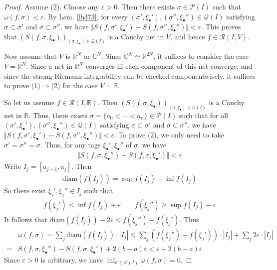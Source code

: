 \documentclass[12pt,b5paper,notitlepage]{article}
\theoremstyle{definition}
\theoremstyle{plain}
\newcommand{\mc}{\mathcal}
\newcommand{\scr}{\mathscr}
\newcommand{\blt}{\bullet}
\newcommand{\Cbb}{\mathbb C}
\newcommand{\Rbb}{\mathbb R}
\newcommand{\dps}{\displaystyle}
\newcommand{\diam}{\mathrm{diam}}
\newcommand{\eps}{\varepsilon}
\numberwithin{equation}{section}
\begin{document}
\begin{proof}
Assume (2). Choose any $\eps>0$. Then there exists $\sigma\in\mc P(I)$ such that $\omega(f,\sigma)<\eps$. By Lem. \ref{lb373}, for every $(\sigma',\xi_\blt'),(\sigma'',\xi_\blt'')\in\mc Q(I)$ satisfying $\sigma\subset\sigma'$ and $\sigma\subset\sigma''$, we have $\Vert S(f,\sigma',\xi_\blt')-S(f,\sigma'',\xi_\blt'')\Vert<\eps$. This proves that $(S(f,\sigma,\xi_\blt))_{(\sigma,\xi_\blt)\in\mc Q(I)}$ is a Cauchy net in $V$, and hence $f\in\scr R(I,V)$.

Now assume that $V$ is $\Rbb^N$ or $\Cbb^N$. Since $\Cbb^N\simeq\Rbb^{2N}$, it suffices to consider the case $V=\Rbb^N$. Since a net in $\Rbb^N$ converges iff each component of this net converge, and since the strong Riemann integrability can be checked componentwisely, it suffices to prove (1)$\Rightarrow$(2) for the case $V=\Rbb$.

So let us assume $f\in\scr R(I,\Rbb)$. Then $(S(f,\sigma,\xi_\blt))_{(\sigma,\xi_\blt)\in\mc Q(I)}$ is a Cauchy net in $\Rbb$. Thus, there exists $\sigma=\{a_0<\cdots<a_n\}\in\mc P(I)$ such that for all $(\sigma',\xi_\blt'),(\sigma'',\xi_\blt'')\in\mc Q(I)$ satisfying $\sigma\subset\sigma'$ and $\sigma\subset\sigma''$, we have $\Vert S(f,\sigma',\xi_\blt')-S(f,\sigma'',\xi_\blt'')\Vert<\eps$. To prove (2), we only need to take $\sigma'=\sigma''=\sigma$. Thus, for any tags $\xi_\blt',\xi_\blt''$ of $\sigma$, we have
\begin{align*}
\Vert S(f,\sigma,\xi_\blt'')-S(f,\sigma,\xi_\blt')\Vert<\eps
\end{align*}
Write $I_j=[a_{j-1},a_j]$. Then
\begin{align*}
\diam(f(I_j))=\sup f(I_j)-\inf f(I_j)
\end{align*}
So  there exist $\xi_j',\xi_j''\in I_j$ such that
\begin{gather*}
f(\xi_j')\leq \inf f(I_j)+\eps\qquad f(\xi_j'')\geq\sup f(I_j)-\eps
\end{gather*}
It follows that $\dps\diam(f(I_j))-2\eps\leq f(\xi_j'')-f(\xi_j')$. Thus
\begin{align*}
&\omega(f,\sigma)=\sum_j \diam(f(I_j))\cdot|I_j|\leq\sum_j (f(\xi_j'')-f(\xi_j'))\cdot|I_j|+\sum_j2\eps\cdot|I_j|\\
=& S(f,\sigma,\xi_\blt'')-S(f,\sigma,\xi_\blt')+2(b-a)\eps<\eps+2(b-a)\eps
\end{align*}
Since $\eps>0$ is arbitrary, we have $\inf_{\sigma\in\mc P(I)} \omega(f,\sigma)=0$.
\end{proof}
\end{document}
